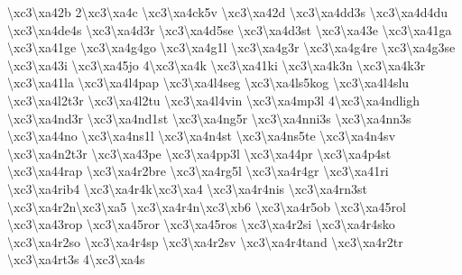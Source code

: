 \begin{DoxyCompactItemize}
\textbackslash{}xc3\textbackslash{}xa42b 2\textbackslash{}xc3\textbackslash{}xa4c \textbackslash{}xc3\textbackslash{}xa4ck5v \textbackslash{}xc3\textbackslash{}xa42d \textbackslash{}xc3\textbackslash{}xa4dd3s \textbackslash{}xc3\textbackslash{}xa4d4du \textbackslash{}xc3\textbackslash{}xa4de4s \textbackslash{}xc3\textbackslash{}xa4d3r \textbackslash{}xc3\textbackslash{}xa4d5se \textbackslash{}xc3\textbackslash{}xa4d3st \textbackslash{}xc3\textbackslash{}xa43e \textbackslash{}xc3\textbackslash{}xa41ga \textbackslash{}xc3\textbackslash{}xa41ge \textbackslash{}xc3\textbackslash{}xa4g4go \textbackslash{}xc3\textbackslash{}xa4g1l \textbackslash{}xc3\textbackslash{}xa4g3r \textbackslash{}xc3\textbackslash{}xa4g4re \textbackslash{}xc3\textbackslash{}xa4g3se \textbackslash{}xc3\textbackslash{}xa43i \textbackslash{}xc3\textbackslash{}xa45jo 4\textbackslash{}xc3\textbackslash{}xa4k \textbackslash{}xc3\textbackslash{}xa41ki \textbackslash{}xc3\textbackslash{}xa4k3n \textbackslash{}xc3\textbackslash{}xa4k3r \textbackslash{}xc3\textbackslash{}xa41la \textbackslash{}xc3\textbackslash{}xa4l4pap \textbackslash{}xc3\textbackslash{}xa4l4seg \textbackslash{}xc3\textbackslash{}xa4ls5kog \textbackslash{}xc3\textbackslash{}xa4l4slu \textbackslash{}xc3\textbackslash{}xa4l2t3r \textbackslash{}xc3\textbackslash{}xa4l2tu \textbackslash{}xc3\textbackslash{}xa4l4vin \textbackslash{}xc3\textbackslash{}xa4mp3l 4\textbackslash{}xc3\textbackslash{}xa4ndligh \textbackslash{}xc3\textbackslash{}xa4nd3r \textbackslash{}xc3\textbackslash{}xa4nd1st \textbackslash{}xc3\textbackslash{}xa4ng5r \textbackslash{}xc3\textbackslash{}xa4nni3s \textbackslash{}xc3\textbackslash{}xa4nn3s \textbackslash{}xc3\textbackslash{}xa44no \textbackslash{}xc3\textbackslash{}xa4ns1l \textbackslash{}xc3\textbackslash{}xa4n4st \textbackslash{}xc3\textbackslash{}xa4ns5te \textbackslash{}xc3\textbackslash{}xa4n4sv \textbackslash{}xc3\textbackslash{}xa4n2t3r \textbackslash{}xc3\textbackslash{}xa43pe \textbackslash{}xc3\textbackslash{}xa4pp3l \textbackslash{}xc3\textbackslash{}xa44pr \textbackslash{}xc3\textbackslash{}xa4p4st \textbackslash{}xc3\textbackslash{}xa44rap \textbackslash{}xc3\textbackslash{}xa4r2bre \textbackslash{}xc3\textbackslash{}xa4rg5l \textbackslash{}xc3\textbackslash{}xa4r4gr \textbackslash{}xc3\textbackslash{}xa41ri \textbackslash{}xc3\textbackslash{}xa4rib4 \textbackslash{}xc3\textbackslash{}xa4r4k\textbackslash{}xc3\textbackslash{}xa4 \textbackslash{}xc3\textbackslash{}xa4r4nis \textbackslash{}xc3\textbackslash{}xa4rn3st \textbackslash{}xc3\textbackslash{}xa4r2n\textbackslash{}xc3\textbackslash{}xa5 \textbackslash{}xc3\textbackslash{}xa4r4n\textbackslash{}xc3\textbackslash{}xb6 \textbackslash{}xc3\textbackslash{}xa4r5ob \textbackslash{}xc3\textbackslash{}xa45rol \textbackslash{}xc3\textbackslash{}xa43rop \textbackslash{}xc3\textbackslash{}xa45ror \textbackslash{}xc3\textbackslash{}xa45ros \textbackslash{}xc3\textbackslash{}xa4r2si \textbackslash{}xc3\textbackslash{}xa4r4sko \textbackslash{}xc3\textbackslash{}xa4r2so \textbackslash{}xc3\textbackslash{}xa4r4sp \textbackslash{}xc3\textbackslash{}xa4r2sv \textbackslash{}xc3\textbackslash{}xa4r4tand \textbackslash{}xc3\textbackslash{}xa4r2tr \textbackslash{}xc3\textbackslash{}xa4rt3s 4\textbackslash{}xc3\textbackslash{}xa4s 
\end{DoxyCompactItemize}
